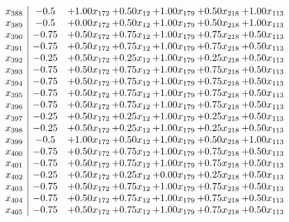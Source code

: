 \documentclass[8pt]{article}
\begin{document}
\[\begin{array}{c| c c@{\hskip 2pt} c@{\hskip 2pt} c@{\hskip 2pt} c@{\hskip 2pt} c@{\hskip 2pt} }
 x_{388}   &  -0.5 & +  1.00 x_{172} & +  0.50 x_{12} & +  1.00 x_{179} & +  0.50 x_{218} & +  1.00 x_{113}\\
 x_{389}   &  -0.5 & +  0.00 x_{172} & +  0.50 x_{12} & +  1.00 x_{179} & +  0.50 x_{218} & +  1.00 x_{113}\\
 x_{390}   &  -0.75 & +  0.50 x_{172} & +  0.75 x_{12} & +  1.00 x_{179} & +  0.75 x_{218} & +  0.50 x_{113}\\
 x_{391}   &  -0.75 & +  0.50 x_{172} & +  0.75 x_{12} & +  1.00 x_{179} & +  0.75 x_{218} & +  0.50 x_{113}\\
 x_{392}   &  -0.25 & +  0.50 x_{172} & +  0.25 x_{12} & +  1.00 x_{179} & +  0.25 x_{218} & +  0.50 x_{113}\\
 x_{393}   &  -0.75 & +  0.50 x_{172} & +  0.75 x_{12} & +  1.00 x_{179} & +  0.75 x_{218} & +  0.50 x_{113}\\
 x_{394}   &  -0.75 & +  0.50 x_{172} & +  0.75 x_{12} & +  1.00 x_{179} & +  0.75 x_{218} & +  0.50 x_{113}\\
 x_{395}   &  -0.75 & +  0.50 x_{172} & +  0.75 x_{12} & +  1.00 x_{179} & +  0.75 x_{218} & +  0.50 x_{113}\\
 x_{396}   &  -0.75 & +  0.50 x_{172} & +  0.75 x_{12} & +  1.00 x_{179} & +  0.75 x_{218} & +  0.50 x_{113}\\
 x_{397}   &  -0.25 & +  0.50 x_{172} & +  0.25 x_{12} & +  1.00 x_{179} & +  0.25 x_{218} & +  0.50 x_{113}\\
 x_{398}   &  -0.25 & +  0.50 x_{172} & +  0.25 x_{12} & +  1.00 x_{179} & +  0.25 x_{218} & +  0.50 x_{113}\\
 x_{399}   &  -0.5 & +  1.00 x_{172} & +  0.50 x_{12} & +  1.00 x_{179} & +  0.50 x_{218} & +  1.00 x_{113}\\
 x_{400}   &  -0.75 & +  0.50 x_{172} & +  0.75 x_{12} & +  1.00 x_{179} & +  0.75 x_{218} & +  0.50 x_{113}\\
 x_{401}   &  -0.75 & +  0.50 x_{172} & +  0.75 x_{12} & +  1.00 x_{179} & +  0.75 x_{218} & +  0.50 x_{113}\\
 x_{402}   &  -0.25 & +  0.50 x_{172} & +  0.25 x_{12} & +  0.00 x_{179} & +  0.25 x_{218} & +  0.50 x_{113}\\
 x_{403}   &  -0.75 & +  0.50 x_{172} & +  0.75 x_{12} & +  1.00 x_{179} & +  0.75 x_{218} & +  0.50 x_{113}\\
 x_{404}   &  -0.75 & +  0.50 x_{172} & +  0.75 x_{12} & +  1.00 x_{179} & +  0.75 x_{218} & +  0.50 x_{113}\\
 x_{405}   &  -0.75 & +  0.50 x_{172} & +  0.75 x_{12} & +  1.00 x_{179} & +  0.75 x_{218} & +  0.50 x_{113}\\

\end{array}\]
\end{document}
